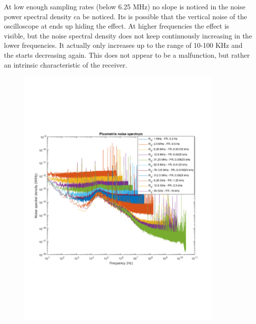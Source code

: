 	At low enough sampling rates (below 6.25 MHz) no slope is noticed in the noise
	power spectral density ca be noticed. Its is possible that the vertical noise
	of the oscilloscope at ends up hiding the effect. At higher frequencies the
	effect is visible, but the noise spectral density does not keep continuously
	increasing in the lower frequencies. It actually only increases  up to the
	range of 10-100 KHz and the starts decreasing again. This does not appear to
	be a malfunction, but rather an intrinsic characteristic of the receiver.

	\begin{figure}[H]
		\centering
		\begin{minipage}{0.45\textwidth}
			\centering
			\includegraphics[clip, trim=1cm 6cm 1cm 6cm,
			width=0.9\textwidth]{./sdf/m_qam_system/figures/experimental/noiseSpectra/picoLogNoise2.pdf}
			\subcaption{\label{fig:noise5g}}
		\end{minipage}
		\begin{minipage}{0.45\textwidth}
			\centering

\end{minipage}
\end{figure}
